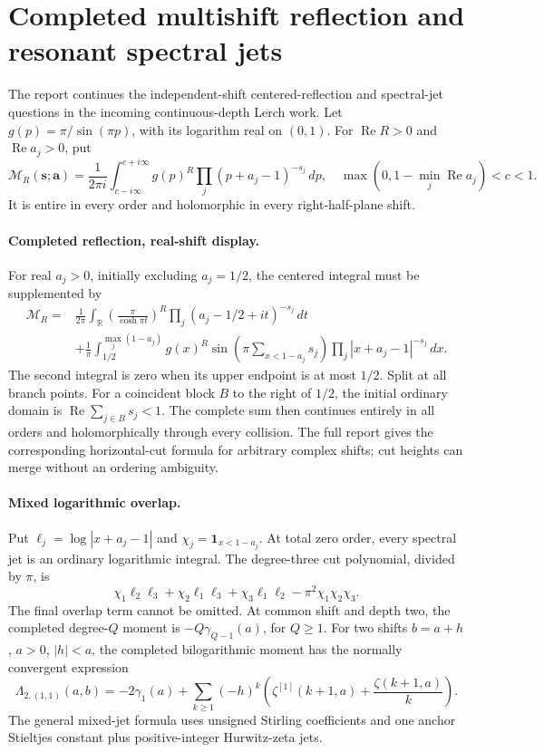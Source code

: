 \section{Completed multishift reflection and resonant spectral jets}
\label{mrc-add:sec}
The report \cite{multishift-reflection-2026} continues the independent-shift
centered-reflection and spectral-jet questions in the incoming continuous-depth
Lerch work. Let $g(p)=\pi/\sin(\pi p)$, with its logarithm real on $(0,1)$.
For $\operatorname{Re}R>0$ and $\operatorname{Re}a_j>0$, put
\[
 \mathcal M_R(\boldsymbol s;\boldsymbol a)
 =\frac1{2\pi i}\int_{c-i\infty}^{c+i\infty}
 g(p)^R\prod_j(p+a_j-1)^{-s_j}\,dp,
 \quad \max(0,1-\min_j\operatorname{Re}a_j)<c<1.
\]
It is entire in every order and holomorphic in every right-half-plane shift.

\paragraph{Completed reflection, real-shift display.}
For real $a_j>0$, initially excluding $a_j=1/2$, the centered integral
must be supplemented by
\begin{align*}
 \mathcal M_R={}&\frac1{2\pi}\int_{\mathbb R}
 \left(\frac\pi{\cosh\pi t}\right)^R
 \prod_j(a_j-1/2+it)^{-s_j}\,dt\\
 &+\frac1\pi\int_{1/2}^{\max_j(1-a_j)}
 g(x)^R\sin\left(\pi\sum_{x<1-a_j}s_j\right)
       \prod_j|x+a_j-1|^{-s_j}\,dx.
\end{align*}
The second integral is zero when its upper endpoint is at most $1/2$.
Split at all branch points. For a coincident block $B$ to the right of
$1/2$, the initial ordinary domain is
$\operatorname{Re}\sum_{j\in B}s_j<1$. The complete sum then continues
entirely in all orders and holomorphically through every collision.
The full report gives the corresponding horizontal-cut formula for arbitrary
complex shifts; cut heights can merge without an ordering ambiguity.

\paragraph{Mixed logarithmic overlap.}
Put $\ell_j=\log|x+a_j-1|$ and $\chi_j=\mathbf1_{x<1-a_j}$.
At total zero order, every spectral jet is an ordinary logarithmic integral.
The degree-three cut polynomial, divided by $\pi$, is
\[
 \chi_1\ell_2\ell_3+\chi_2\ell_1\ell_3+\chi_3\ell_1\ell_2
       -\pi^2\chi_1\chi_2\chi_3.
\]
The final overlap term cannot be omitted. At common shift and depth two,
the completed degree-$Q$ moment is $-Q\gamma_{Q-1}(a)$, for $Q\ge1$.
For two shifts $b=a+h$, $a>0$, $|h|<a$, the completed bilogarithmic
moment has the normally convergent expression
\[
 \Lambda_{2,(1,1)}(a,b)
 =-2\gamma_1(a)+\sum_{k\ge1}(-h)^k
  \left(\zeta^{[1]}(k+1,a)+\frac{\zeta(k+1,a)}k\right).
\]
The general mixed-jet formula uses unsigned Stirling coefficients and
one anchor Stieltjes constant plus positive-integer Hurwitz-zeta jets.

